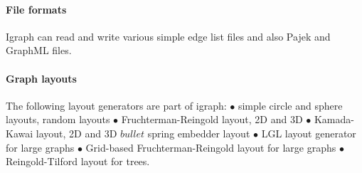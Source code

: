 \documentclass[twoside]{book}%
\begin{document}
\paragraph{File formats} Igraph can read and write various simple edge
list files and also Pajek and GraphML files.

\paragraph{Graph layouts} The following layout generators are part of
igraph: $\bullet$ simple circle and sphere layouts, random layouts
$\bullet$ Fruchterman-Reingold layout, 2D and 3D $\bullet$
Kamada-Kawai layout, 2D and 3D $bullet$ spring embedder layout
$\bullet$ LGL layout generator for large graphs $\bullet$ Grid-based
Fruchterman-Reingold layout for large graphs $\bullet$
Reingold-Tilford layout for trees.


\end{document}
